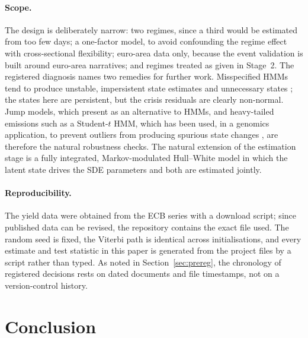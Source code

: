 \documentclass[11pt,a4paper]{article}
\begin{document}
\paragraph{Scope.} The design is deliberately narrow: two regimes, since a third would be estimated from too few days; a one-factor model, to avoid confounding the regime effect with cross-sectional flexibility; euro-area data only, because the event validation is built around euro-area narratives; and regimes treated as given in Stage~2. The registered diagnosis names two remedies for further work. Misspecified HMMs tend to produce unstable, impersistent state estimates and unnecessary states \citep[Sec.~3.1]{nystrup2021}; the states here are persistent, but the crisis residuals are clearly non-normal. Jump models, which \citet{nystrup2021} present as an alternative to HMMs, and heavy-tailed emissions such as a Student-$t$ HMM, which has been used, in a genomics application, to prevent outliers from producing spurious state changes \citep[as reported in][p.~11]{nystrup2021}, are therefore the natural robustness checks. The natural extension of the estimation stage is a fully integrated, Markov-modulated Hull--White model in which the latent state drives the SDE parameters and both are estimated jointly.

\paragraph{Reproducibility.} The yield data were obtained from the ECB series with a download script; since published data can be revised, the repository contains the exact file used. The random seed is fixed, the Viterbi path is identical across \NStarts{} initialisations, and every estimate and test statistic in this paper is generated from the project files by a script rather than typed. As noted in Section~\ref{sec:prereg}, the chronology of registered decisions rests on dated documents and file timestamps, not on a version-control history.

\section{Conclusion}\label{sec:conclusion}
\end{document}
